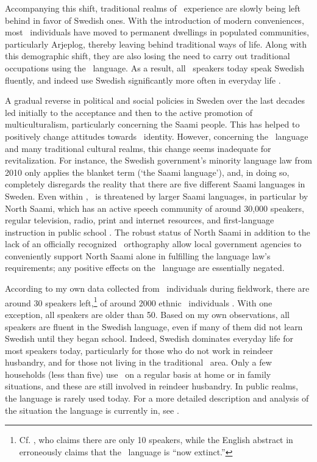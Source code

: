 Accompanying this shift, traditional realms of \PS\ experience are slowly being left behind in favor of Swedish ones. With the introduction of modern conveniences, most \PS\ individuals have moved to permanent dwellings in populated communities, particularly Arjeplog, thereby leaving behind traditional ways of life. Along with this demographic shift, they are also losing the need to carry out traditional occupations using the \PS\ language. As a result, all \PS\ speakers today speak Swedish fluently, and indeed use Swedish significantly more often in everyday life \citep[cf.][]{ValijarviWilbur2011}.

A gradual reverse in political and social policies in Sweden over the last decades led initially to the acceptance and then to the active promotion of multiculturalism, particularly concerning the Saami people. This has helped to positively change attitudes towards \PS\ identity. However, concerning the \PS\ language and many traditional cultural realms, this change seems inadequate for revitalization. For instance, the Swedish government's minority language law from 2010 only applies the blanket term  (‘the Saami language’), and, in doing so, completely disregards the reality that there are five different Saami languages in Sweden. Even within , \PS\ is threatened by larger Saami languages, in particular by North Saami, which has an active speech community of around 30,000 speakers, regular television, radio, print and internet resources, and first-language instruction in public school \citep[cf.][209-211]{Salminen2007}. The robust status of North Saami in addition to the lack of an officially recognized \PS\ orthography allow local government agencies to conveniently support North Saami alone in fulfilling the language law's requirements; any positive effects on the \PS\ language are essentially negated.

According to my own data collected from \PS\ individuals during fieldwork, there are around 30 speakers left,\footnote{Cf. \citet[221]{Salminen2007}, who claims there are only 10 speakers, while the English abstract in \citet{Lehtiranta1992} erroneously claims that the \PS\ language is “now extinct.”} 
of around 2000 ethnic \PS\ individuals \citep[24]{Krauss1997}. With one exception, all speakers are older than 50. %
Based on my own observations, all speakers are fluent in the Swedish language, even if many of them did not learn Swedish until they began school. Indeed, Swedish dominates everyday life for most speakers today, particularly for those who do not work in reindeer husbandry, and for those not living in the traditional \PS\ area. Only a few households (less than five) use \PS\ on a regular basis at home or in family situations, and these are still involved in reindeer husbandry. In public realms, the language is rarely used today. For a more detailed description and analysis of the situation the language is currently in, see \citet{ValijarviWilbur2011}.

